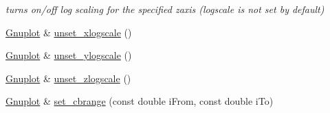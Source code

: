 \begin{DoxyCompactItemize}
\begin{DoxyCompactList}\small\item\em turns on/off log scaling for the specified zaxis (logscale is not set by default) \end{DoxyCompactList}\item 
\hyperlink{classkukadu_1_1Gnuplot}{Gnuplot} \& \hyperlink{classkukadu_1_1Gnuplot_a8d4ff3b840757c7d7e248aa2932dfd9e}{unset\+\_\+xlogscale} ()
\item 
\hyperlink{classkukadu_1_1Gnuplot}{Gnuplot} \& \hyperlink{classkukadu_1_1Gnuplot_ab4faf2a5d5572733967ef00b03937a98}{unset\+\_\+ylogscale} ()
\item 
\hyperlink{classkukadu_1_1Gnuplot}{Gnuplot} \& \hyperlink{classkukadu_1_1Gnuplot_a2bccf59dc2f3dc853d45e6f0ebbc33e2}{unset\+\_\+zlogscale} ()
\item 
\hyperlink{classkukadu_1_1Gnuplot}{Gnuplot} \& \hyperlink{classkukadu_1_1Gnuplot_ab1eeecc6cca9d87af3be7af4e37ab1c0}{set\+\_\+cbrange} (const double i\+From, const double i\+To)\hypertarget{classkukadu_1_1Gnuplot_ab1eeecc6cca9d87af3be7af4e37ab1c0}{}\label{classkukadu_1_1Gnuplot_ab1eeecc6cca9d87af3be7af4e37ab1c0}


\end{DoxyCompactItemize}
